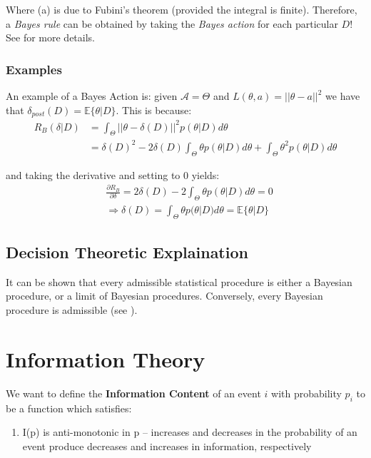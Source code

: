 \documentclass[]{article}
\begin{document}
Where (a) is due to Fubini's theorem (provided the integral is finite).
Therefore, a \emph{Bayes rule} can be obtained by taking the \emph{Bayes action} for each particular $D$! See \cite{PHoffNotes2} for more details.

\subsubsection{Examples}
An example of a Bayes Action is: given \(\mathcal{A} = \Theta\) and \(L(\theta,a) = ||\theta-a||^2\) we have that \(\delta_{post}(D) = \mathbb{E}\{\theta|D\}\). This is because:
\begin{align*}
R_B(\delta|D) &= \int_{\Theta}^{}||\theta-\delta(D)||^2p(\theta|D)d\theta \\
&=\delta(D)^2 -2\delta(D)\int_{\Theta}^{}\theta p(\theta|D)d\theta+\int_{\Theta}^{}\theta^2 p(\theta|D)d\theta
\end{align*}

and taking the derivative and setting to 0 yields:
\begin{align*}
&\frac{\partial R_B}{\partial \delta} = 2\delta(D) -2\int_{\Theta}^{}\theta p(\theta|D)d\theta = 0 \\
&\Rightarrow \delta(D) = \int_{\Theta}^{}\theta p(\theta|D)d\theta = \mathbb{E}\{\theta|D\}
\end{align*}

\subsection{Decision Theoretic Explaination}
It can be shown that every admissible statistical procedure is either a Bayesian procedure, or a limit of Bayesian procedures. Conversely, every Bayesian procedure is admissible (see \cite{PHoffNotes}).

\newpage



\section{Information Theory}

We want to define the \textbf{Information Content} of an event $i$ with probability $p_i$ to be a function which satisfies:
\begin{enumerate}
	\item I(p) is anti-monotonic in p – increases and decreases in the probability of an event produce decreases and increases in information, respectively
\end{enumerate}
\end{document}
